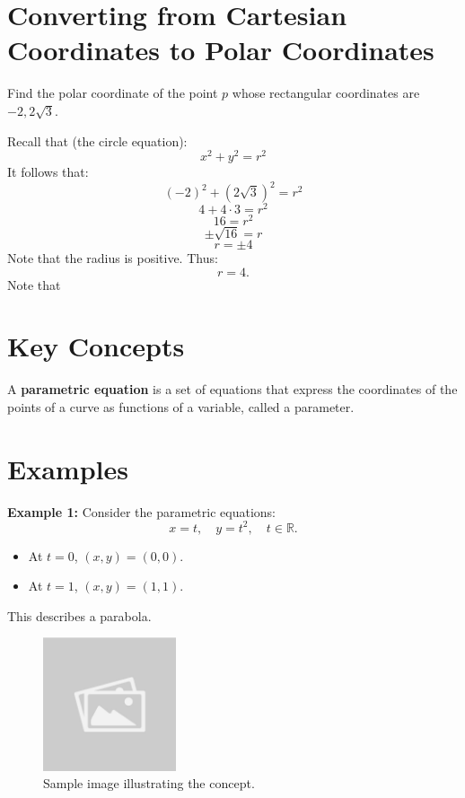 \documentclass{article}
\begin{document}
\section*{Converting from Cartesian Coordinates to Polar Coordinates}
\begin{examplebox}
Find the polar coordinate of the point \( p \) whose rectangular coordinates are \( -2, 2\sqrt{3} \).

\begin{solutionbox}
Recall that (the circle equation):
\[
    x^2 + y^2 = r^2
\]
It follows that:
\[
    (-2)^2 + (2\sqrt{3})^2 = r^2
\]
\[
    4 + 4 \cdot 3 = r^2
\]
\[
    16 = r^2
\]
\[
    \pm \sqrt{16} = r 
\]
\[
    r = \pm 4
\]
Note that the radius is positive. Thus:
\[
    r = 4 \text{.}
\]
Note that
\end{solutionbox}
\end{examplebox}

\section*{Key Concepts}
\begin{definitionbox}
A \textbf{parametric equation} is a set of equations that express the coordinates of the points of a curve as functions of a variable, called a parameter.
\end{definitionbox}

\section*{Examples}
\begin{examplebox}
\textbf{Example 1:} Consider the parametric equations:
\[ x = t, \quad y = t^2, \quad t \in \mathbb{R}. \]
\begin{itemize}
    \item At $t = 0$, $(x, y) = (0, 0)$.
    \item At $t = 1$, $(x, y) = (1, 1)$.
\end{itemize}
This describes a parabola.

\begin{figure}[H]
    \centering
    \includegraphics[width=0.35\textwidth]{sample_image.jpg}
    \caption{Sample image illustrating the concept.}
    \label{fig:sample_image}
\end{figure}

\end{examplebox}
\end{document}
